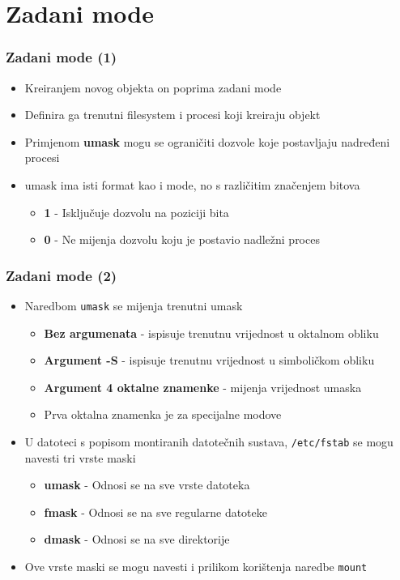 \documentclass[table,usenames,dvipsnames] {beamer}
\newcommand{\shell}[1]{\texttt{#1}}
\begin{document}
\section{Zadani mode}
\begin{frame}[t]
\frametitle{Zadani mode (1)}
\begin{itemize}
  \item Kreiranjem novog objekta on poprima zadani mode
  \item Definira ga trenutni filesystem i procesi koji kreiraju objekt
\end{itemize}
\begin{itemize}
  \item Primjenom \textbf{umask} mogu se ograničiti dozvole koje postavljaju nadređeni procesi
  \item umask ima isti format kao i mode, no s različitim značenjem bitova
  \begin{itemize}
    \item \textbf{1} - Isključuje dozvolu na poziciji bita
    \item \textbf{0} - Ne mijenja dozvolu koju je postavio nadležni proces
  \end{itemize}
\end{itemize}
\end{frame}

\begin{frame}[t]
  \frametitle{Zadani mode (2)}
\begin{itemize}
  \item Naredbom \shell{umask} se mijenja trenutni umask
  \begin{itemize}
    \item \textbf{Bez argumenata} - ispisuje trenutnu vrijednost u oktalnom obliku
    \item \textbf{Argument -S} - ispisuje trenutnu vrijednost u simboličkom obliku
    \item \textbf{Argument 4 oktalne znamenke} - mijenja vrijednost umaska
    \item[] \hspace{1em} Prva oktalna znamenka je za specijalne modove
  \end{itemize}
\end{itemize}
\begin{itemize}
  \item U datoteci s popisom montiranih datotečnih sustava, \shell{/etc/fstab} se mogu navesti tri vrste maski
  \begin{itemize}
    \item \textbf{umask} - Odnosi se na sve vrste datoteka
    \item \textbf{fmask} - Odnosi se na sve regularne datoteke
    \item \textbf{dmask} - Odnosi se na sve direktorije
  \end{itemize}
  \item Ove vrste maski se mogu navesti i prilikom korištenja naredbe \shell{mount}
\end{itemize}
\end{frame}
  
\end{document}
